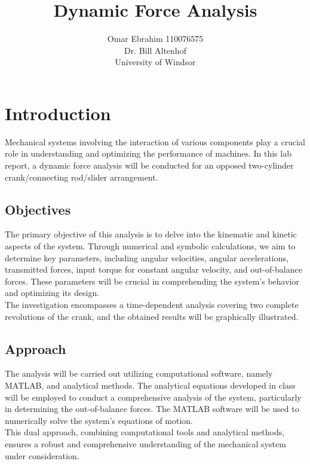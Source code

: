 \documentclass[12pt, titlepage]{article}
\title{Dynamic Force Analysis}
\author{Omar Ebrahim 110076575\\Dr. Bill Altenhof\\ University of Windsor}
\begin{document}
\maketitle
\newpage
\tableofcontents
\listoffigures
\listoftables
\thispagestyle{tocstyle}
\newpage
\section{Introduction}
Mechanical systems involving the interaction of various components play a
crucial role in understanding and optimizing the performance of machines. In
this lab report, a dynamic force analysis will be conducted for an opposed
two-cylinder crank/connecting rod/slider arrangement. 
\subsection{Objectives}
The primary objective of this analysis is to delve into the kinematic and
kinetic aspects of the system. Through numerical and symbolic calculations, we
aim to determine key parameters, including angular velocities, angular
accelerations, transmitted forces, input torque for constant angular velocity,
and out-of-balance forces. These parameters will be crucial in comprehending
the system's behavior and optimizing its design.\\[10pt]
The investigation encompasses a time-dependent analysis covering two complete
revolutions of the crank, and the obtained results will be graphically
illustrated.
\subsection{Approach}
The analysis will be carried out utilizing computational
software, namely MATLAB, and analytical methods. The analytical equations
developed in class will be employed to conduct a comprehensive analysis of the
system, particularly in determining the out-of-balance forces. The MATLAB
software will be used to numerically solve the system's equations of motion.\\[10pt]
This dual approach, combining computational tools and analytical methods,
ensures a robust and comprehensive understanding of the mechanical system under
consideration.
\newpage
\end{document}
